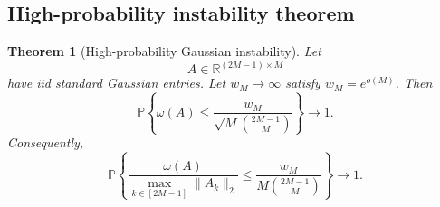 \documentclass[11pt]{article}
\newtheorem{theorem}{Theorem}
\newcommand{\R}{\mathbb R}
\newcommand{\Pbb}{\mathbb P}
\newcommand{\1}{\mathbf 1}
\begin{document}
\subsection{High-probability instability theorem}

\begin{theorem}[High-probability Gaussian instability]
\label{thm:high-probability-gaussian-instability}
Let
\[
        A\in\R^{(2M-1)\times M}
\]
have iid standard Gaussian entries.  Let \(w_M\to\infty\) satisfy \(w_M=e^{o(M)}\).  Then
\begin{equation}
        \Pbb\left\{
        \omega(A)
        \le
        \frac{w_M}{\sqrt M\binom{2M-1}{M}}
        \right\}
        \longrightarrow 1.
        \label{eq:hp-omega}
\end{equation}
Consequently,
\begin{equation}
        \Pbb\left\{
        \frac{\omega(A)}{\max_{k\in[2M-1]}\|A_k\|_2}
        \le
        \frac{w_M}{M\binom{2M-1}{M}}
        \right\}
        \longrightarrow 1.
        \label{eq:hp-normalized}
\end{equation}
\end{theorem}
\end{document}
